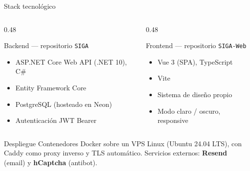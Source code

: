 \documentclass[11pt,aspectratio=169]{beamer}
\begin{document}
\begin{frame}{Stack tecnológico}
  \begin{columns}[T,onlytextwidth]
    \begin{column}{0.48\textwidth}
      \begin{block}{Backend --- \textnormal{repositorio \texttt{SIGA}}}
        \begin{itemize}\small
          \item ASP.NET Core Web API (.NET 10), C\#
          \item Entity Framework Core
          \item PostgreSQL (hosteado en Neon)
          \item Autenticación JWT Bearer
        \end{itemize}
      \end{block}
    \end{column}
    \begin{column}{0.48\textwidth}
      \begin{block}{Frontend --- \textnormal{repositorio \texttt{SIGA-Web}}}
        \begin{itemize}\small
          \item Vue 3 (SPA), TypeScript
          \item Vite
          \item Sistema de diseño propio
          \item Modo claro / oscuro, responsive
        \end{itemize}
      \end{block}
    \end{column}
  \end{columns}

  \vspace{8pt}
  \begin{block}{Despliegue}
    \small Contenedores Docker sobre un VPS Linux (Ubuntu 24.04 LTS), con Caddy
    como proxy inverso y TLS automático. Servicios externos: \textbf{Resend} (email)
    y \textbf{hCaptcha} (antibot).
  \end{block}
\end{frame}
\end{document}
